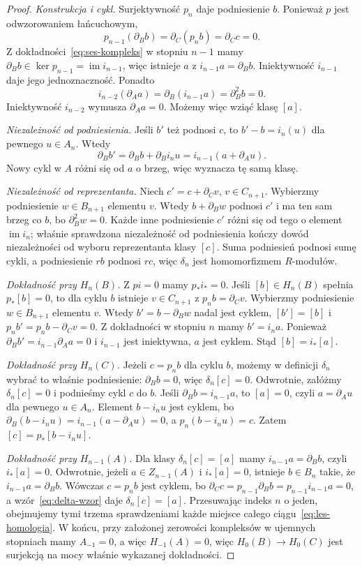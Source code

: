 \documentclass[11pt,a4paper,oneside]{report}
\theoremstyle{plain}
\theoremstyle{definition}
\theoremstyle{remark}
\begin{document}
\begin{proof}
\emph{Konstrukcja i cykl.} Surjektywność $p_n$
daje podniesienie $b$. Ponieważ $p$ jest odwzorowaniem łańcuchowym,
\[
 p_{n-1}(\partial_Bb)=\partial_C(p_nb)=\partial_Cc=0.
\]
Z dokładności~\eqref{eq:ses-kompleks} w
stopniu $n-1$ mamy
$\partial_Bb\in\ker p_{n-1}=\operatorname{im}i_{n-1}$,
więc istnieje $a$ z $i_{n-1}a=\partial_Bb$.
Iniektywność $i_{n-1}$ daje jego jednoznaczność.
Ponadto
\[
 i_{n-2}(\partial_Aa)
 =\partial_B(i_{n-1}a)=\partial_B^2b=0.
\]
Iniektywność $i_{n-2}$ wymusza $\partial_Aa=0$.
Możemy więc wziąć klasę $[a]$.

\emph{Niezależność od podniesienia.} Jeśli $b'$ też
podnosi $c$, to $b'-b=i_n(u)$ dla pewnego
$u\in A_n$. Wtedy
\[
 \partial_Bb'=\partial_Bb+\partial_Bi_nu
 =i_{n-1}(a+\partial_Au).
\]
Nowy cykl w $A$ różni się od $a$ o brzeg,
więc wyznacza tę samą klasę.

\emph{Niezależność od reprezentanta.}
Niech $c'=c+\partial_Cv$, $v\in C_{n+1}$.
Wybierzmy podniesienie $w\in B_{n+1}$ elementu $v$.
Wtedy $b+\partial_Bw$ podnosi $c'$ i ma ten sam
brzeg co $b$, bo $\partial_B^2w=0$.
Każde inne podniesienie $c'$ różni się od tego
o element $\operatorname{im}i_n$; właśnie
sprawdzona niezależność od podniesienia
kończy dowód niezależności od wyboru reprezentanta klasy $[c]$.
Suma podniesień podnosi sumę cykli, a
podniesienie $rb$ podnosi $rc$, więc $\delta_n$
jest homomorfizmem $R$-modułów.

\emph{Dokładność przy $H_n(B)$.}
Z $pi=0$ mamy $p_*i_*=0$.
Jeśli $[b]\in H_n(B)$ spełnia
$p_*[b]=0$, to dla cyklu $b$
istnieje $v\in C_{n+1}$ z
$p_nb=\partial_Cv$. Wybierzmy podniesienie
$w\in B_{n+1}$ elementu $v$.
Wtedy $b'=b-\partial_Bw$ nadal jest cyklem,
$[b']=[b]$ i
$p_nb'=p_nb-\partial_Cv=0$. Z dokładności
w stopniu $n$ mamy $b'=i_na$.
Ponieważ $\partial_Bb'=i_{n-1}\partial_Aa=0$
i $i_{n-1}$ jest iniektywna, $a$ jest
cyklem. Stąd $[b]=i_*[a]$.

\emph{Dokładność przy $H_n(C)$.}
Jeżeli $c=p_nb$ dla cyklu $b$, możemy
w definicji $\delta_n$ wybrać to właśnie
podniesienie: $\partial_Bb=0$, więc $\delta_n[c]=0$.
Odwrotnie, załóżmy $\delta_n[c]=0$
i podnieśmy cykl $c$ do $b$.
Jeśli $\partial_Bb=i_{n-1}a$, to $[a]=0$,
czyli $a=\partial_Au$ dla pewnego $u\in A_n$.
Element $b-i_nu$ jest cyklem, bo
$\partial_B(b-i_nu)=i_{n-1}(a-\partial_Au)=0$,
a $p_n(b-i_nu)=c$. Zatem
$[c]=p_*[b-i_nu]$.

\emph{Dokładność przy $H_{n-1}(A)$.}
Dla klasy $\delta_n[c]=[a]$ mamy
$i_{n-1}a=\partial_Bb$, czyli $i_*[a]=0$.
Odwrotnie, jeżeli $a\in Z_{n-1}(A)$
i $i_*[a]=0$, istnieje $b\in B_n$
takie, że $i_{n-1}a=\partial_Bb$.
Wówczas $c=p_nb$ jest cyklem, bo
$\partial_Cc=p_{n-1}\partial_Bb=p_{n-1}i_{n-1}a=0$,
a wzór~\eqref{eq:delta-wzor} daje
$\delta_n[c]=[a]$.
Przesuwając indeks $n$ o jeden,
obejmujemy tymi trzema sprawdzeniami
każde miejsce całego ciągu~\eqref{eq:les-homologia}.
W końcu, przy założonej zerowości kompleksów w ujemnych
stopniach mamy $A_{-1}=0$, a więc
$H_{-1}(A)=0$, więc $H_0(B)\to H_0(C)$
jest surjekcją na mocy właśnie wykazanej
dokładności.
\end{proof}
\end{document}
